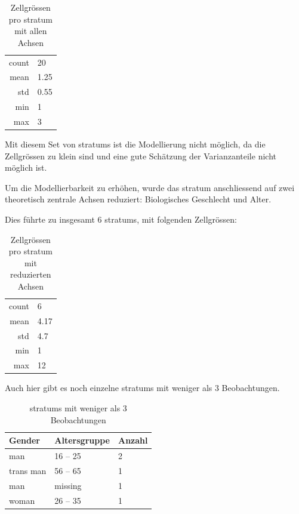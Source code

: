 \begin{table}[h]
    \centering
    \begin{tabular}{rl}
        count & 20 \\
        mean & 1.25 \\
        std & 0.55 \\
        min & 1 \\
        max & 3 \\
    \end{tabular}
    \caption{Zellgrössen pro \gls{stratum} mit allen Achsen}
    \label{tab:zellgroessen_alle_achsen}
\end{table}

Mit diesem Set von \glspl{stratum} ist die Modellierung nicht möglich, da die Zellgrössen zu klein sind und eine gute Schätzung der Varianzanteile nicht möglich ist.

Um die Modellierbarkeit zu erhöhen, wurde das \gls{stratum} anschliessend auf zwei theoretisch zentrale Achsen reduziert: Biologisches Geschlecht und Alter.

Dies führte zu insgesamt $6$ \glspl{stratum}, mit folgenden Zellgrössen:

\begin{table}[h]
    \centering
    \begin{tabular}{rl}
        count & 6 \\
        mean & 4.17 \\
        std & 4.7 \\
        min & 1 \\
        max & 12 \\
    \end{tabular}
    \caption{Zellgrössen pro \gls{stratum} mit reduzierten Achsen}
    \label{tab:zellgroessen_reduzierte_achsen}
\end{table}

Auch hier gibt es noch einzelne \glspl{stratum} mit weniger als 3 Beobachtungen.

\begin{table}[h]
    \centering
    \begin{tabular}{lll}
        Gender & Altersgruppe & Anzahl \\
        \hline
        man & 16 -- 25 & 2 \\
        trans man & 56 -- 65 & 1 \\
        man & missing & 1 \\
        woman & 26 -- 35 & 1 \\
    \end{tabular}
    \caption{\glspl{stratum} mit weniger als 3 Beobachtungen}
    \label{tab:zellgroessen_reduzierte_achsen_kleine_strata}
\end{table}

